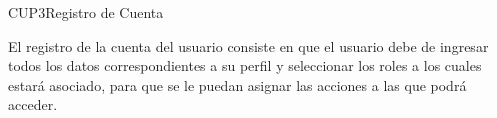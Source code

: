 \begin{UseCase}{CUP3}{Registro de Cuenta}
    {

    	
    	El registro de la cuenta del usuario consiste en que el usuario debe de ingresar todos los datos correspondientes a su perfil y seleccionar los roles a los cuales estará asociado, para que se le puedan asignar las acciones a las que podrá acceder.
    
    	
    }


\end{UseCase}
